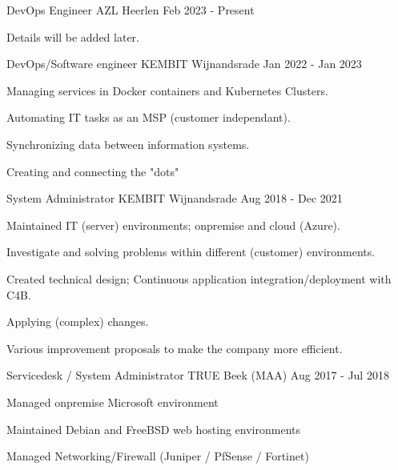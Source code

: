 \documentclass[11pt, letterpaper]{awesome-cv}
\begin{document}
\begin{cventries}


  \cventry
    {DevOps Engineer}
    {AZL}
    {Heerlen}
    {Feb 2023 - Present}
    {
      \begin{cvitems}
        \item{Details will be added later.}
      \end{cvitems}
    }


  \cventry
    {DevOps/Software engineer}
    {KEMBIT}
    {Wijnandsrade}
    {Jan 2022 - Jan 2023}
    {
      \begin{cvitems}
        \item{Managing services in Docker containers and Kubernetes Clusters.}
        \item{Automating IT tasks as an MSP (customer independant).}
        \item{Synchronizing data between information systems.}
        \item{Creating and connecting the "dots"}
      \end{cvitems}
    }


  \cventry
    {System Administrator}
    {KEMBIT}
    {Wijnandsrade}
    {Aug 2018 - Dec 2021}
    {
      \begin{cvitems}
        \item{Maintained IT (server) environments; onpremise and cloud (Azure).}
        \item{Investigate and solving problems within different (customer) environments.}
        \item{Created technical design; Continuous application integration/deployment with C4B.}
        \item{Applying (complex) changes.}
        \item{Various improvement proposals to make the company more efficient.}
      \end{cvitems}
    }


  \cventry
    {Servicedesk / System Administrator}
    {TRUE}
    {Beek (MAA)}
    {Aug 2017 - Jul 2018}
    {
      \begin{cvitems}
        \item{Managed onpremise Microsoft environment}
        \item{Maintained Debian and FreeBSD web hosting environments}
        \item{Managed Networking/Firewall (Juniper / PfSense / Fortinet)}
      \end{cvitems}
    }



\end{cventries}
\end{document}
